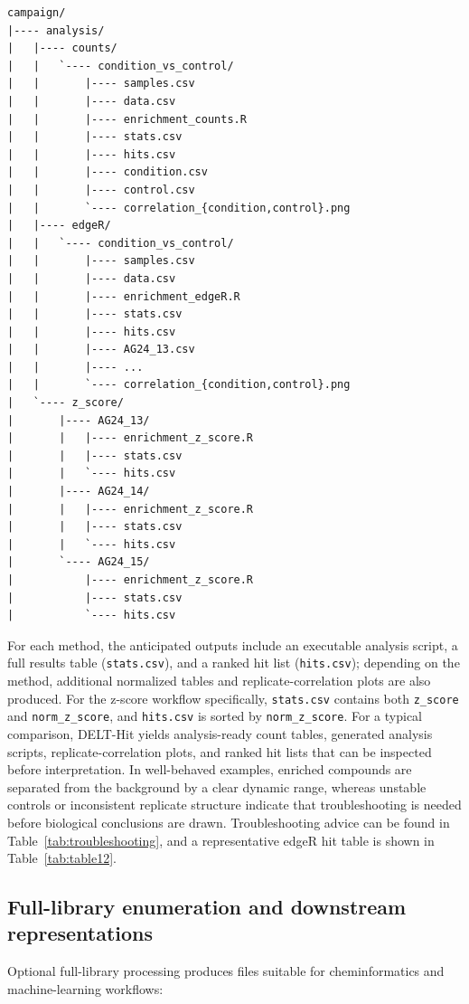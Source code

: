 \documentclass[pdflatex,sn-nature]{sn-jnl}
\begin{document}
\begin{lstlisting}
campaign/
|---- analysis/
|   |---- counts/
|   |   `---- condition_vs_control/
|   |       |---- samples.csv
|   |       |---- data.csv
|   |       |---- enrichment_counts.R
|   |       |---- stats.csv
|   |       |---- hits.csv
|   |       |---- condition.csv
|   |       |---- control.csv
|   |       `---- correlation_{condition,control}.png
|   |---- edgeR/
|   |   `---- condition_vs_control/
|   |       |---- samples.csv
|   |       |---- data.csv
|   |       |---- enrichment_edgeR.R
|   |       |---- stats.csv
|   |       |---- hits.csv
|   |       |---- AG24_13.csv
|   |       |---- ...
|   |       `---- correlation_{condition,control}.png
|   `---- z_score/
|       |---- AG24_13/
|       |   |---- enrichment_z_score.R
|       |   |---- stats.csv
|       |   `---- hits.csv
|       |---- AG24_14/
|       |   |---- enrichment_z_score.R
|       |   |---- stats.csv
|       |   `---- hits.csv
|       `---- AG24_15/
|           |---- enrichment_z_score.R
|           |---- stats.csv
|           `---- hits.csv
\end{lstlisting}

For each method, the anticipated outputs include an executable analysis script, a full results table (\texttt{stats.csv}), and a ranked hit list (\texttt{hits.csv}); depending on the method, additional normalized tables and replicate-correlation plots are also produced. For the z-score workflow specifically, \texttt{stats.csv} contains both \texttt{z\_score} and \texttt{norm\_z\_score}, and \texttt{hits.csv} is sorted by \texttt{norm\_z\_score}. For a typical comparison, DELT-Hit yields analysis-ready count tables, generated analysis scripts, replicate-correlation plots, and ranked hit lists that can be inspected before interpretation. In well-behaved examples, enriched compounds are separated from the background by a clear dynamic range, whereas unstable controls or inconsistent replicate structure indicate that troubleshooting is needed before biological conclusions are drawn. Troubleshooting advice can be found in Table~\ref{tab:troubleshooting}, and a representative edgeR hit table is shown in Table~\ref{tab:table12}.

\subsection{Full-library enumeration and downstream representations}
Optional full-library processing produces files suitable for cheminformatics and machine-learning workflows:
\end{document}
